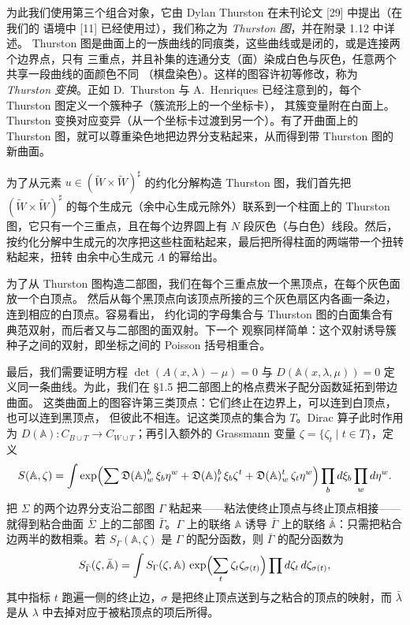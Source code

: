 为此我们使用第三个组合对象，它由 Dylan Thurston 在未刊论文 [29] 中提出（在我们的
语境中 [11] 已经使用过），我们称之为 \emph{Thurston 图}，并在附录 1.12 中详述。
Thurston 图是曲面上的一族曲线的同痕类，这些曲线或是闭的，或是连接两个边界点，只有
三重点，并且补集的连通分支（面）染成白色与灰色，任意两个共享一段曲线的面颜色不同
（棋盘染色）。这样的图容许初等修改，称为 \emph{Thurston 变换}。正如 D.~Thurston 与
A.~Henriques 已经注意到的，每个 Thurston 图定义一个簇种子（簇流形上的一个坐标卡），
其簇变量附在白面上。Thurston 变换对应变异（从一个坐标卡过渡到另一个）。有了开曲面上的
Thurston 图，就可以尊重染色地把边界分支粘起来，从而得到带 Thurston 图的新曲面。

为了从元素 $u\in(\tilde W\times\tilde W)^\sharp$ 的约化分解构造 Thurston 图，我们首先把
$(\tilde W\times\tilde W)^\sharp$ 的每个生成元（余中心生成元除外）联系到一个柱面上的
Thurston 图，它只有一个三重点，且在每个边界圆上有 $N$ 段灰色（与白色）线段。然后，
按约化分解中生成元的次序把这些柱面粘起来，最后把所得柱面的两端带一个扭转粘起来，扭转
由余中心生成元 $\Lambda$ 的幂给出。

为了从 Thurston 图构造二部图，我们在每个三重点放一个黑顶点，在每个灰色面放一个白顶点。
然后从每个黑顶点向该顶点所接的三个灰色扇区内各画一条边，连到相应的白顶点。容易看出，
约化词的字母集合与 Thurston 图的白面集合有典范双射，而后者又与二部图的面双射。下一个
观察同样简单：这个双射诱导簇种子之间的双射，即坐标之间的 Poisson 括号相重合。

最后，我们需要证明方程 $\det(A(x,\lambda)-\mu)=0$ 与 $D(\mathbb{A}(x,\lambda,\mu))=0$
定义同一条曲线。为此，我们在 §1.5 把二部图上的格点费米子配分函数延拓到带边曲面。
这类曲面上的图容许第三类顶点：它们终止在边界上，可以连到白顶点，也可以连到黑顶点，
但彼此不相连。记这类顶点的集合为 $T$。Dirac 算子此时作用为
$D(\mathbb{A}):C_{B\cup T}\to C_{W\cup T}$；再引入额外的 Grassmann 变量
$\zeta=\{\zeta_t\mid t\in T\}$，定义
\[
S(\mathbb{A},\zeta)=\int \exp\Bigl(\sum \mathfrak{D}(\mathbb{A})^b_w\,\xi_b\eta^w
+\mathfrak{D}(\mathbb{A})^b_t\,\xi_b\zeta^t
+\mathfrak{D}(\mathbb{A})^t_w\,\zeta_t\eta^w\Bigr)
\prod_b d\xi_b\prod_w d\eta^w .
\]
把 $\Sigma$ 的两个边界分支沿二部图 $\Gamma$ 粘起来——粘法使终止顶点与终止顶点相接——
就得到粘合曲面 $\bar\Sigma$ 上的二部图 $\bar\Gamma$。$\Gamma$ 上的联络 $\mathbb{A}$ 诱导
$\bar\Gamma$ 上的联络 $\bar{\mathbb{A}}$：只需把粘合边两半的数相乘。若
$S_\Gamma(\mathbb{A},\zeta)$ 是 $\Gamma$ 的配分函数，则 $\bar\Gamma$ 的配分函数为
\[
S_{\bar\Gamma}(\zeta,\bar{\mathbb{A}})
=\int S_\Gamma(\zeta,\mathbb{A})\,
\exp\Bigl(\sum_t \zeta_t\zeta_{\sigma(t)}\Bigr)
\prod d\zeta_t\,d\zeta_{\sigma(t)},
\]
其中指标 $t$ 跑遍一侧的终止边，$\sigma$ 是把终止顶点送到与之粘合的顶点的映射，而
$\bar\lambda$ 是从 $\lambda$ 中去掉对应于被粘顶点的项后所得。

